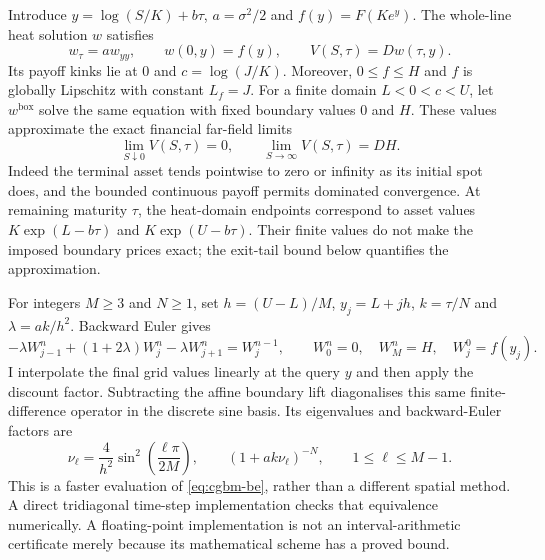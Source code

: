 \documentclass[11pt]{article}
\begin{document}
Introduce $y=\log(S/K)+b\tau$, $a=\sigma^2/2$ and
$f(y)=F(K e^y)$. The whole-line heat solution $w$ satisfies
\begin{equation}
 w_\tau=a w_{yy},\qquad w(0,y)=f(y),\qquad
 V(S,\tau)=D w(\tau,y).
 \label{eq:cgbm-heat}
\end{equation}
Its payoff kinks lie at $0$ and $c=\log(J/K)$. Moreover,
$0\leq f\leq H$ and $f$ is globally Lipschitz with constant
$L_f=J$. For a finite domain $L<0<c<U$, let $w^{\mathrm{box}}$ solve the
same equation with fixed boundary values $0$ and $H$.
These values approximate the exact financial far-field limits
\begin{equation}
 \lim_{S\downarrow0}V(S,\tau)=0,\qquad
 \lim_{S\to\infty}V(S,\tau)=DH.
 \label{eq:cgbm-far-field}
\end{equation}
Indeed the terminal asset tends pointwise to zero or infinity as its
initial spot does, and the bounded continuous payoff permits dominated
convergence. At remaining maturity $\tau$, the heat-domain endpoints
correspond to asset values $K\exp(L-b\tau)$ and
$K\exp(U-b\tau)$. Their finite values do not make the imposed boundary
prices exact; the exit-tail bound below quantifies the approximation.

For integers $M\geq3$ and $N\geq1$, set
$h=(U-L)/M$, $y_j=L+jh$, $k=\tau/N$ and
$\lambda=ak/h^2$. Backward Euler gives
\begin{equation}
 -\lambda W_{j-1}^{n}+(1+2\lambda)W_j^{n}
 -\lambda W_{j+1}^{n}=W_j^{n-1},\qquad
 W_0^n=0,\quad W_M^n=H,\quad W_j^0=f(y_j).
 \label{eq:cgbm-be}
\end{equation}
I interpolate the final grid values linearly at the query $y$ and then
apply the discount factor. Subtracting the affine boundary lift diagonalises
this same finite-difference operator in the discrete sine basis. Its
eigenvalues and backward-Euler factors are
\begin{equation}
 \nu_\ell=\frac{4}{h^2}\sin^2\!\left(\frac{\ell\pi}{2M}\right),
 \qquad (1+ak\nu_\ell)^{-N},\qquad 1\leq\ell\leq M-1.
 \label{eq:cgbm-dst}
\end{equation}
This is a faster evaluation of \eqref{eq:cgbm-be}, rather than a different
spatial method. A direct tridiagonal time-step implementation checks that
equivalence numerically. A floating-point implementation is not an
interval-arithmetic certificate merely because its mathematical scheme
has a proved bound.
\end{document}
